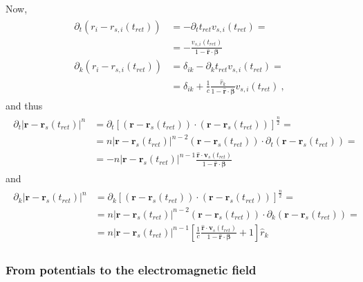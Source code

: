 \documentclass[letterpaper,10pt,english]{jupyterBook}
\begin{document}
\sphinxAtStartPar
Now,
\begin{equation*}
\begin{split}\begin{aligned}
  \partial_t ( r_{i} - r_{s,i}(t_{ret}))
  & = - \partial_t t_{ret} v_{s,i}(t_{ret}) = \\
  & = - \frac{v_{s,i}(t_{ret})}{1 - \hat{\mathbf{r}} \cdot \boldsymbol{\beta}} \\
  \partial_k (r_{i} - r_{s,i}(t_{ret}))
  & = \delta_{ik} - \partial_k t_{ret} v_{s,i} (t_{ret})  = \\
  & = \delta_{ik} + \frac{1}{c} \frac{\hat{r}_k}{1-\hat{\mathbf{r}} \cdot \boldsymbol\beta} v_{s,i} (t_{ret})  \ ,
\end{aligned}\end{split}
\end{equation*}
\sphinxAtStartPar
and thus
\begin{equation*}
\begin{split}\begin{aligned}
  \partial_t | \mathbf{r} - \mathbf{r}_s(t_{ret}) |^n
  & = \partial_t \left[ ( \mathbf{r} - \mathbf{r}_s(t_{ret}) ) \cdot ( \mathbf{r} - \mathbf{r}_s(t_{ret}) ) \right]^{\frac{n}{2}} = \\
  & = n  | \mathbf{r} - \mathbf{r}_s(t_{ret}) |^{n-2} ( \mathbf{r} - \mathbf{r}_s(t_{ret}) ) \cdot \partial_t ( \mathbf{r} - \mathbf{r}_s(t_{ret}) ) = \\
  & = - n | \mathbf{r} - \mathbf{r}_s(t_{ret}) |^{n-1}\frac{  \hat{\mathbf{r}} \cdot \mathbf{v}_s(t_{ret}) }{1 - \hat{\mathbf{r}} \cdot \boldsymbol\beta} 
\end{aligned}\end{split}
\end{equation*}
\sphinxAtStartPar
and
\begin{equation*}
\begin{split}\begin{aligned}
  \partial_k | \mathbf{r} - \mathbf{r}_s(t_{ret}) |^n
  & = \partial_k \left[ ( \mathbf{r} - \mathbf{r}_s(t_{ret}) ) \cdot ( \mathbf{r} - \mathbf{r}_s(t_{ret}) ) \right]^{\frac{n}{2}} = \\
  & = n  | \mathbf{r} - \mathbf{r}_s(t_{ret}) |^{n-2} ( \mathbf{r} - \mathbf{r}_s(t_{ret}) ) \cdot \partial_k ( \mathbf{r} - \mathbf{r}_s(t_{ret}) ) = \\
  & = n | \mathbf{r} - \mathbf{r}_s(t_{ret}) |^{n-1} \left[ \frac{1}{c} \frac{  \hat{\mathbf{r}} \cdot \mathbf{v}_s(t_{ret}) }{1 - \hat{\mathbf{r}} \cdot \boldsymbol\beta} + 1 \right] \hat{r}_k
\end{aligned}\end{split}
\end{equation*}\subsubsection*{From potentials to the electromagnetic field}
\end{document}
